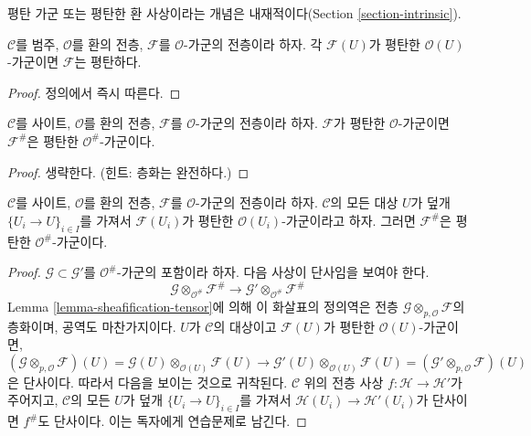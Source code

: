 \noindent
평탄 가군 또는 평탄한 환 사상이라는 개념은 내재적이다(Section
\ref{section-intrinsic}).

\begin{lemma}
\label{lemma-flatness-presheaves}
$\mathcal{C}$를 범주, $\mathcal{O}$를 환의 전층, $\mathcal{F}$를
$\mathcal{O}$-가군의 전층이라 하자. 각 $\mathcal{F}(U)$가 평탄한
$\mathcal{O}(U)$-가군이면 $\mathcal{F}$는 평탄하다.
\end{lemma}

\begin{proof}
정의에서 즉시 따른다.
\end{proof}

\begin{lemma}
\label{lemma-flatness-sheafification}
$\mathcal{C}$를 사이트, $\mathcal{O}$를 환의 전층, $\mathcal{F}$를
$\mathcal{O}$-가군의 전층이라 하자. $\mathcal{F}$가 평탄한
$\mathcal{O}$-가군이면 $\mathcal{F}^\#$은 평탄한
$\mathcal{O}^\#$-가군이다.
\end{lemma}

\begin{proof}
생략한다. (힌트: 층화는 완전하다.)
\end{proof}

\begin{lemma}
\label{lemma-flatness-sheafification-refined}
$\mathcal{C}$를 사이트, $\mathcal{O}$를 환의 전층, $\mathcal{F}$를
$\mathcal{O}$-가군의 전층이라 하자. $\mathcal{C}$의 모든 대상 $U$가
덮개 $\{U_i \to U\}_{i \in I}$를 가져서 $\mathcal{F}(U_i)$가 평탄한
$\mathcal{O}(U_i)$-가군이라고 하자. 그러면 $\mathcal{F}^\#$은 평탄한
$\mathcal{O}^\#$-가군이다.
\end{lemma}

\begin{proof}
$\mathcal{G} \subset \mathcal{G}'$를 $\mathcal{O}^\#$-가군의 포함이라 하자.
다음 사상이 단사임을 보여야 한다.
$$
\mathcal{G} \otimes_{\mathcal{O}^\#} \mathcal{F}^\#
\longrightarrow
\mathcal{G}' \otimes_{\mathcal{O}^\#} \mathcal{F}^\#
$$
Lemma \ref{lemma-sheafification-tensor}에 의해 이 화살표의 정의역은 전층
$\mathcal{G} \otimes_{p, \mathcal{O}} \mathcal{F}$의 층화이며, 공역도
마찬가지이다. $U$가 $\mathcal{C}$의 대상이고 $\mathcal{F}(U)$가 평탄한
$\mathcal{O}(U)$-가군이면,
$$
(\mathcal{G} \otimes_{p, \mathcal{O}} \mathcal{F})(U) =
\mathcal{G}(U) \otimes_{\mathcal{O}(U)} \mathcal{F}(U)
\longrightarrow
\mathcal{G}'(U) \otimes_{\mathcal{O}(U)} \mathcal{F}(U) =
(\mathcal{G}' \otimes_{p, \mathcal{O}} \mathcal{F})(U)
$$
은 단사이다. 따라서 다음을 보이는 것으로 귀착된다. $\mathcal{C}$ 위의 전층
사상 $f : \mathcal{H} \to \mathcal{H}'$가 주어지고, $\mathcal{C}$의 모든
$U$가 덮개 $\{U_i \to U\}_{i \in I}$를 가져서
$\mathcal{H}(U_i) \to \mathcal{H}'(U_i)$가 단사이면 $f^\#$도 단사이다.
이는 독자에게 연습문제로 남긴다.
\end{proof}

